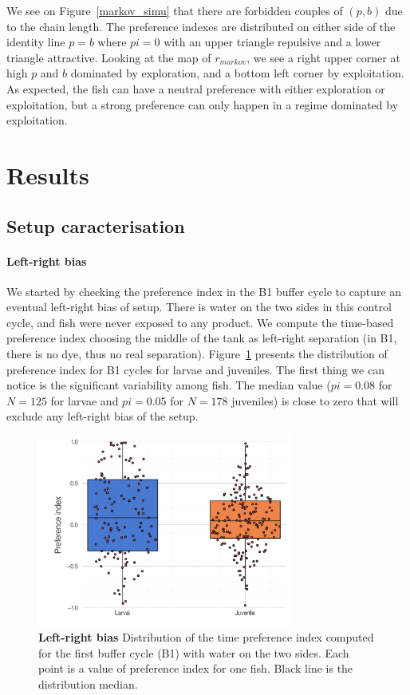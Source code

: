  We see on Figure~\ref{markov_simu} that there are forbidden couples of $(p,b)$ due to the chain length. The preference indexes are distributed on either side of the identity line $p=b$ where $pi = 0$ with an upper triangle repulsive and a lower triangle attractive. Looking at the map of $r_{markov}$, we see a right upper corner at high $p$ and $b$ dominated by exploration, and a bottom left corner by exploitation. As expected, the fish can have a neutral preference with either exploration or exploitation, but a strong preference can only happen in a regime dominated by exploitation.

  \section{Results}
  \subsection{Setup caracterisation}
  \paragraph{Left-right bias} We started by checking the preference index in the B1 buffer cycle to capture an eventual left-right bias of setup. There is water on the two sides in this control cycle, and fish were never exposed to any product. We compute the time-based preference index choosing the middle of the tank as left-right separation (in B1, there is no dye, thus no real separation). Figure~\ref{ld_bias} presents the distribution of preference index for B1 cycles for larvae and juveniles. The first thing we can notice is the significant variability among fish. The median value ($pi = 0.08$ for $N=125$ for larvae and $pi = 0.05$ for $N = 178$ juveniles) is close to zero that will exclude any left-right bias of the setup.

    \begin{figure}[h]
      \centering
      \includegraphics[width=0.75\textwidth]{part_2/assets/ld_bias.png}
      \caption{\textbf{Left-right bias} Distribution of the time preference index computed for the first buffer cycle (B1) with water on the two sides. Each point is a value of preference index for one fish. Black line is the distribution median.}
      \label{ld_bias}
    \end{figure}

